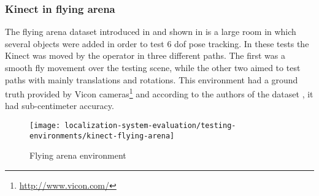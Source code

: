 \subsubsection{Kinect in flying arena}

The flying arena dataset introduced in \cite{Pomerleau2011} and shown in  is a large room in which several objects were added in order to test 6 \gls{dof} pose tracking. In these tests the Kinect was moved by the operator in three different paths. The first was a smooth fly movement over the testing scene, while the other two aimed to test paths with mainly translations and rotations. This environment had a ground truth provided by Vicon cameras\footnote{\url{http://www.vicon.com/}} and according to the authors of the dataset \cite{Pomerleau2011}, it had sub-centimeter accuracy.

\begin{figure}[H]
	\centering
	\texttt{[image: localization-system-evaluation/testing-environments/kinect-flying-arena]}
	\caption{Flying arena environment \cite{Pomerleau2011}}
	\label{fig:localization-system-evaluation_flying-arena}
\end{figure}
